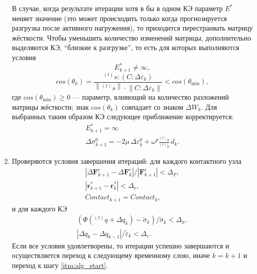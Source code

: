\documentclass[]{article}
\begin{document}
\begin{enumerate}
	В случае, когда результате итерации хотя в бы в одном КЭ параметр $E^*$ меняет значение (это может происходить только когда прогнозируется разгрузка после активного нагружения), то приходится перестраивать матрицу жёсткости. Чтобы уменьшить количество изменений матрицы, дополнительно выделяются КЭ, \textquotedblleft близкие к разгрузке\textquotedblright, то есть для которых выполняются условия
	\begin{equation}
	E_{k+1}^*\neq\infty,
	\label{F:F_algoritm_unload_criterion1}
	\end{equation}
	\begin{equation}
	cos\left(\theta_k\right)=\frac{{}^{(t)}s:\left(C:\Delta\varepsilon_k\right) }{\left\|{}^{(t)}s\right\|\cdot \left\|C:\Delta\varepsilon_k\right\|}<cos\left(\theta_{\mathrm{min}}\right),
	\label{F:F_algoritm_unload_criterion2}
	\end{equation}
	где $cos\left(\theta_{\mathrm{min}}\right)\geqslant0$ --- параметр, влияющий на количество разложений матрицы жёсткости; знак $cos\left(\theta_k\right)$ совпадает со знаком $\Delta W_k$. Для выбранных таким образом КЭ следующее приближение корректируется:
	\begin{equation}
	\begin{gathered}
	\mbox{$E_{k+1}^*=\infty$}\\
	\Delta\sigma_{k+1}^0=-2\mu\,\Delta\varepsilon_{k}^p+\omega^{p}\frac{{}^{(t)}s}{{}^{(t)}\tilde{s}}\,d_k.
	\label{F:F_algoritm_unload_correction}
	\end{gathered}
	\end{equation}

	\item
	Проверяются условия завершения итераций: для каждого контактного узла
	\begin{equation}
	\begin{gathered}
	\left|\Delta\mathbf{F}_{k+1}^{c}-\Delta\mathbf{F}_k^{c}\right|/\left|\mathbf{F}_{k+1}^{c}\right|<\Delta_F,\\
	\left|\mathbf{r}_{k+1}^{*}-\mathbf{r}_k^{*}\right|<\Delta_r,\\
	Contact_{k+1}=Contact_{k},
	\label{F:F_algoritm10}
	\end{gathered}
	\end{equation}
	и для каждого КЭ
	\begin{equation}
	\begin{gathered}
	\left(\Phi\left({}^{(t)}q+\Delta q_k\right)-\tilde{\sigma}_k\right)/\tilde{\sigma}_{k}<\Delta_{\sigma},\\
	\left|\Delta q_{k}-\Delta q_{k-1}\right|/\tilde{\varepsilon}_{k}<\Delta_{\varepsilon}.
	\label{F:F_algoritm11}
	\end{gathered}
	\end{equation}
	Если все условия удовлетворены, то итерации успешно завершаются и осуществляется переход к следующему временному слою, иначе $k=k+1$ и переход к шагу \ref{itm:alg_start}.
\end{enumerate}
\end{document}

